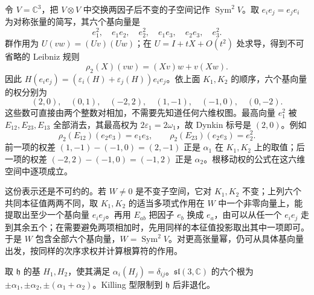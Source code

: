 \begin{example}
令 $V=\mathbb C^3$，把 $V\otimes V$ 中交换两因子后不变的子空间记作 $\operatorname{Sym}^2V$。取 $e_i e_j=e_j e_i$ 为对称张量的简写，其六个基向量是
\[
e_1^2,\quad e_1e_2,\quad e_2^2,\quad
e_1e_3,\quad e_2e_3,\quad e_3^2.
\]
群作用为 $U(vw)=(Uv)(Uw)$；在 $U=I+tX+O(t^2)$ 处求导，得到不可省略的 Leibniz 规则
\begin{equation}
\rho_2(X)(vw)=(Xv)w+v(Xw).
\label{eq:su3-symmetric-square-action}
\end{equation}
因此 $H(e_ie_j)=(\varepsilon_i(H)+\varepsilon_j(H))e_ie_j$。依上面 $K_1,K_2$ 的顺序，六个基向量的权分别为
\[
(2,0),\quad(0,1),\quad(-2,2),\quad
(1,-1),\quad(-1,0),\quad(0,-2).
\]
这些数可直接由两个整数对相加，不需要先知道任何六维权图。最高向量 $e_1^2$ 被 $E_{12},E_{23},E_{13}$ 全部消去，其最高权为 $2\varepsilon_1=2\omega_1$，故 Dynkin 标号是 $(2,0)$。例如
\[
\rho_2(E_{12})(e_2e_3)=e_1e_3,
\qquad
\rho_2(E_{23})(e_2e_3)=e_2^2.
\]
前一项的权差 $(1,-1)-(-1,0)=(2,-1)$ 正是 $\alpha_1$ 在 $K_1,K_2$ 上的取值；后一项的权差 $(-2,2)-(-1,0)=(-1,2)$ 正是 $\alpha_2$。根移动权的公式在这六维空间中逐项成立。

这份表示还是不可约的。若 $W\ne0$ 是不变子空间，它对 $K_1,K_2$ 不变；上列六个共同本征值两两不同，取 $K_1,K_2$ 的适当多项式作用在 $W$ 中一个非零向量上，能提取出至少一个基向量 $e_i e_j$。再用 $E_{ab}$ 把因子 $e_b$ 换成 $e_a$，由可以从任一个 $e_i e_j$ 走到其余五个；在需要避免两项相加时，先用同样的本征值投影取出其中一项即可。于是 $W$ 包含全部六个基向量，$W=\operatorname{Sym}^2V$。对更高张量幂，仍可从具体基向量出发，按同样的次序求权并计算根算符的作用。
\end{example}

\begin{proposition}
取 $\mathfrak h$ 的基 $H_1,H_2$，使其满足 $\alpha_i(H_j)=\delta_{ij}$。$\mathfrak{sl}(3,\mathbb C)$ 的六个根为
$\pm\alpha_1,\pm\alpha_2,\pm(\alpha_1+\alpha_2)$。Killing 型限制到 $\mathfrak h$ 后非退化。
\end{proposition}

